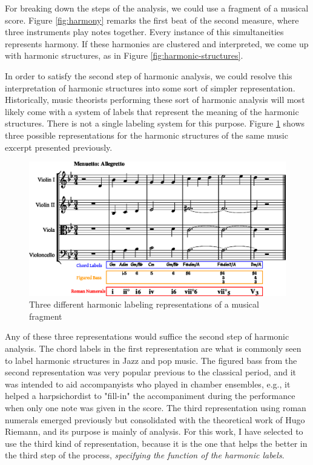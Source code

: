 For breaking down the steps of the analysis, we could use a fragment of a musical score. Figure \ref{fig:harmony} remarks the first beat of the second measure, where three instruments play notes together. Every instance of this simultaneities represents harmony. If these harmonies are clustered and interpreted, we come up with harmonic structures, as in Figure \ref{fig:harmonic-structures}.

In order to satisfy the second step of harmonic analysis, we could resolve this interpretation of harmonic structures into some sort of simpler representation. Historically, music theorists performing these sort of harmonic analysis will most likely come with a system of labels that represent the meaning of the harmonic structures. There is not a single labeling system for this purpose. Figure \ref{fig:harmonic-labels} shows three possible representations for the harmonic structures of the same music excerpt presented previously.

\begin{figure}[h]
  \caption{Three different harmonic labeling representations of a musical fragment}
  \label{fig:harmonic-labels}
  \centering
    \includegraphics[width=1.0\textwidth]{01-introduction/figures/3}
\end{figure}

Any of these three representations would suffice the second step of harmonic analysis. The chord labels in the first representation are what is commonly seen to label harmonic structures in Jazz and pop music. The figured bass from the second representation was very popular previous to the classical period, and it was intended to aid accompanyists who played in chamber ensembles, e.g., it helped a harpsichordist to "fill-in" the accompaniment during the performance when only one note was given in the score. The third representation using roman numerals emerged previously but consolidated with the theoretical work of Hugo Riemann, and its purpose is mainly of analysis. For this work, I have selected to use the third kind of representation, because it is the one that helps the better in the third step of the process, \emph{specifying the function of the harmonic labels}.

